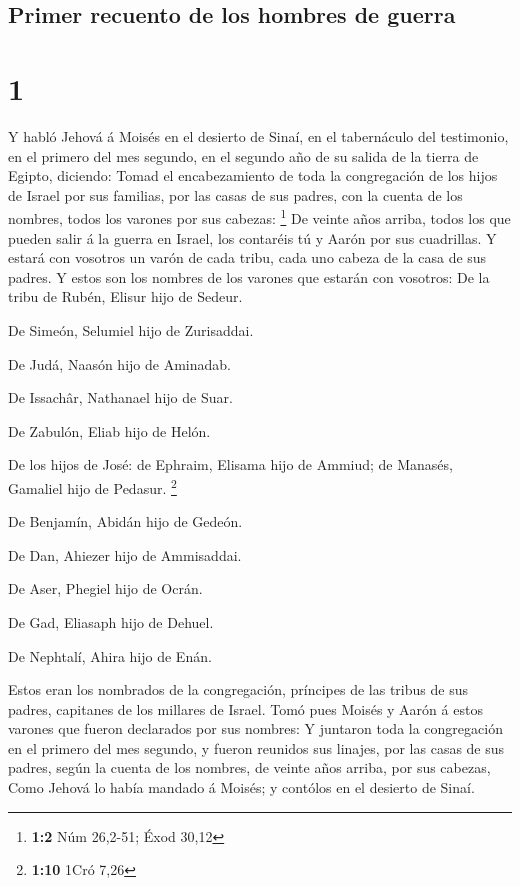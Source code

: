 \hypertarget{primer-recuento-de-los-hombres-de-guerra}{%
\subsection{Primer recuento de los hombres de
guerra}\label{primer-recuento-de-los-hombres-de-guerra}}

\hypertarget{section}{%
\section{1}\label{section}}

 Y habló Jehová á Moisés en el desierto de Sinaí, en el
tabernáculo del testimonio, en el primero del mes segundo, en el segundo
año de su salida de la tierra de Egipto, diciendo:  Tomad el
encabezamiento de toda la congregación de los hijos de Israel por sus
familias, por las casas de sus padres, con la cuenta de los nombres,
todos los varones por sus cabezas: \footnote{\textbf{1:2} Núm 26,2-51;
  Éxod 30,12}  De veinte años arriba, todos los que pueden
salir á la guerra en Israel, los contaréis tú y Aarón por sus
cuadrillas.  Y estará con vosotros un varón de cada tribu,
cada uno cabeza de la casa de sus padres.  Y estos son los
nombres de los varones que estarán con vosotros: De la tribu de Rubén,
Elisur hijo de Sedeur.

 De Simeón, Selumiel hijo de Zurisaddai.

 De Judá, Naasón hijo de Aminadab.

 De Issachâr, Nathanael hijo de Suar.

 De Zabulón, Eliab hijo de Helón.

 De los hijos de José: de Ephraim, Elisama hijo de Ammiud;
de Manasés, Gamaliel hijo de Pedasur. \footnote{\textbf{1:10} 1Cró 7,26}

 De Benjamín, Abidán hijo de Gedeón.

 De Dan, Ahiezer hijo de Ammisaddai.

 De Aser, Phegiel hijo de Ocrán.

 De Gad, Eliasaph hijo de Dehuel.

 De Nephtalí, Ahira hijo de Enán.

 Estos eran los nombrados de la congregación, príncipes de
las tribus de sus padres, capitanes de los millares de Israel.
 Tomó pues Moisés y Aarón á estos varones que fueron
declarados por sus nombres:  Y juntaron toda la
congregación en el primero del mes segundo, y fueron reunidos sus
linajes, por las casas de sus padres, según la cuenta de los nombres, de
veinte años arriba, por sus cabezas,  Como Jehová lo había
mandado á Moisés; y contólos en el desierto de Sinaí.

